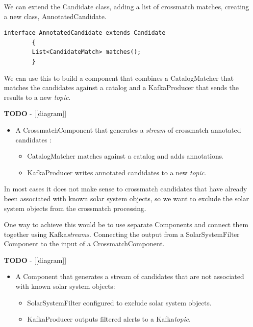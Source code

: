 \documentclass{article}
\newcommand{\kafka} {Kafka\xspace}
\newcommand{\kftopic} {\textit{topic}\xspace}
\newcommand{\kfstream} {\textit{stream}\xspace}
\newcommand{\kfstreams} {\textit{streams}\xspace}
\newcommand{\crossmatch} {crossmatch\xspace}
\newcommand{\javaname}[1] {{\ttfamily\color{codeblue} #1}}
\newcommand{\javaplural}[1] {\javaname{#1}s}
\begin{document}
We can extend the \javaname{Candidate} class, adding a list of \crossmatch matches, creating a new class, \javaname{AnnotatedCandidate}.

\begin{lstlisting}[style=Java]
    interface AnnotatedCandidate extends Candidate
        {
        List<CandidateMatch> matches();
        }
\end{lstlisting}

We can use this to build a component that combines a \javaname{CatalogMatcher} that matches the candidates against a catalog and a \javaname{KafkaProducer} that sends the results to a new \kftopic.

\textbf{TODO} - [[diagram]]

\begin{itemize}
    \item A \javaname{CrossmatchComponent} that generates a \kfstream of \crossmatch annotated candidates :
    \begin{itemize}
        \item \javaname{CatalogMatcher} matches against a catalog and adds annotations.
    \end{itemize}
    \begin{itemize}
        \item \javaname{KafkaProducer} writes annotated candidates to a new \kftopic.
    \end{itemize}
\end{itemize}

In most cases it does not make sense to \crossmatch candidates that have already been associated with known solar system objects, so we want to exclude the solar system objects from the \crossmatch processing.

One way to achieve this would be to use separate \javaplural{Component} and connect them together using \kafka \kfstreams. Connecting the output from a \javaname{SolarSystemFilter} \javaname{Component} to the input of a \javaname{CrossmatchComponent}.

\textbf{TODO} - [[diagram]]

\begin{itemize}
    \item A \javaname{Component} that generates a stream of candidates that are not associated with known solar system objects:
    \begin{itemize}
        \item \javaname{SolarSystemFilter} configured to exclude solar system objects.
    \end{itemize}
    \begin{itemize}
        \item \javaname{KafkaProducer} outputs filtered alerts to a \kafka \kftopic.
    \end{itemize}
\end{itemize}
\end{document}
